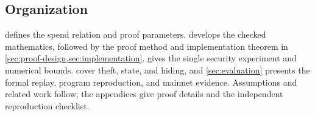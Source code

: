 \subsection{Organization}

 defines the spend relation and proof parameters.
 develops the checked mathematics, followed by the proof
method and implementation theorem in
\cref{sec:proof-design,sec:implementation}.   gives the
single security experiment and numerical bounds.
 cover theft, state, and hiding, and
\cref{sec:evaluation} presents the formal replay, program reproduction, and
mainnet evidence.  Assumptions and related work follow; the appendices give
proof details and the independent reproduction checklist.
